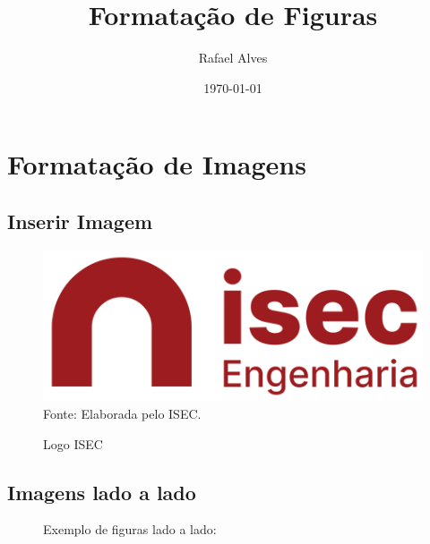 \documentclass[12pt,a4paper,twoside]{article}
\title{Formatação de Figuras}
\author{Rafael Alves}
\date{\today}
\begin{document}
\maketitle


\section{Formatação de Imagens}
\subsection{Inserir Imagem}

\begin{figure}[!htb]   %
    \centering
    \caption{Logo ISEC}
    \includegraphics[width=13cm]{Imagens/ISEC.png}\\
    {\footnotesize Fonte: Elaborada pelo ISEC.}
    \label{fig01}
\end{figure}


\subsection{Imagens lado a lado}

\begin{figure}[!htb]
    \centering
    \caption{Exemplo de figuras lado a lado:}
    \label{figlado}
    \hfill %
\end{figure}
\end{document}
